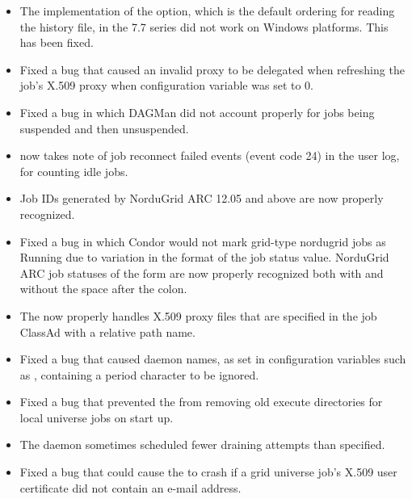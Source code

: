 \begin{itemize}
\item The implementation of the   option, 
which is the default ordering for reading the history file,
in the 7.7 series did not work on Windows platforms.
This has been fixed.

\item Fixed a bug that caused an invalid proxy to be delegated when
refreshing the job's X.509 proxy when configuration variable
 was set to 0.

\item Fixed a bug in which DAGMan did not account properly for jobs being
suspended and then unsuspended.

\item {} now takes note of job reconnect failed 
events (event code 24) in the user log, for counting idle jobs.

\item Job IDs generated by NorduGrid ARC 12.05 and above are now
properly recognized.

\item Fixed a bug in which Condor would not mark grid-type nordugrid jobs
as Running due to variation in the format of the job status value.
NorduGrid ARC job statuses of the form  are now
properly recognized both with and without the space after the colon.

\item The  now properly handles X.509 proxy files
that are specified in the job ClassAd with a relative path name.

\item Fixed a bug that caused daemon names,
as set in configuration variables such as ,
containing a period character to be ignored.

\item Fixed a bug that prevented the  from removing old
execute directories for local universe jobs on start up.

\item The  daemon sometimes scheduled fewer draining attempts 
than specified.

\item Fixed a bug that could cause the  to crash if a
grid universe job's X.509 user certificate did not contain an e-mail
address.


\end{itemize}
